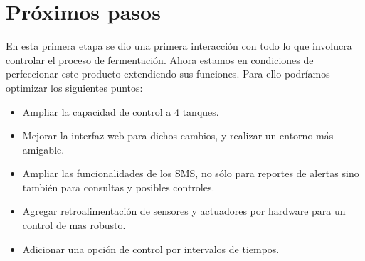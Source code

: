 \section{Próximos pasos}

En esta primera etapa se dio una primera interacción con todo lo que involucra controlar el proceso de fermentación. Ahora estamos en condiciones de perfeccionar este producto extendiendo sus funciones.
Para ello podríamos optimizar los siguientes puntos:
  \begin{itemize}
    \item Ampliar la capacidad de control a 4 tanques.
    \item Mejorar la interfaz web para dichos cambios, y realizar un entorno más amigable.
    \item Ampliar las funcionalidades de los SMS, no sólo para reportes de alertas sino también para consultas y posibles controles. 
    \item Agregar retroalimentación de sensores y actuadores por hardware para un control de mas robusto.
    \item Adicionar una opción de control por intervalos de tiempos. 
   \end{itemize} 


